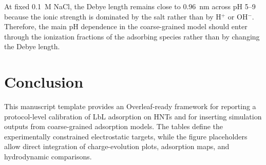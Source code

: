 \documentclass[11pt]{article}
\begin{document}
At fixed \SI{0.1}{M} NaCl, the Debye length remains close to \SI{0.96}{nm} across pH 5--9 because the ionic strength is dominated by the salt rather than by H$^+$ or OH$^-$. Therefore, the main pH dependence in the coarse-grained model should enter through the ionization fractions of the adsorbing species rather than by changing the Debye length.

\section{Conclusion}
This manuscript template provides an Overleaf-ready framework for reporting a protocol-level calibration of LbL adsorption on HNTs and for inserting simulation outputs from coarse-grained adsorption models. The tables define the experimentally constrained electrostatic targets, while the figure placeholders allow direct integration of charge-evolution plots, adsorption maps, and hydrodynamic comparisons.



\end{document}
